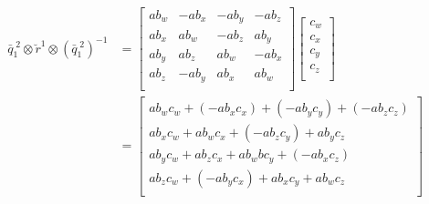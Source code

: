 \begin{parts}
    \begin{equation*}
        \begin{split}
            \bar{q}_1^{\;2} \otimes \breve{r}^1 \otimes \left(\bar{q}_1^{\;2}\right)^{-1} & =
            \begin{bmatrix}
                ab_w & - ab_x & - ab_y & -ab_z  \\
                ab_x & ab_w   & - ab_z & ab_y   \\
                ab_y & ab_z   & ab_w   & - ab_x \\
                ab_z & -ab_y  & ab_x   & ab_w   \\
            \end{bmatrix}
            \begin{bmatrix}
                c_w \\
                c_x \\
                c_y \\
                c_z \\
            \end{bmatrix} \\
            & =
            \begin{bmatrix}
                ab_wc_w + (-ab_xc_x) + (-ab_yc_y) + (-ab_zc_z) \\
                ab_xc_w + ab_wc_x + (-ab_zc_y) + ab_yc_z       \\
                ab_yc_w + ab_zc_x + ab_wbc_y + (-ab_xc_z)      \\
                ab_zc_w + (-ab_yc_x) + ab_xc_y + ab_wc_z       \\
            \end{bmatrix}
        \end{split}
    \end{equation*}

\end{parts}